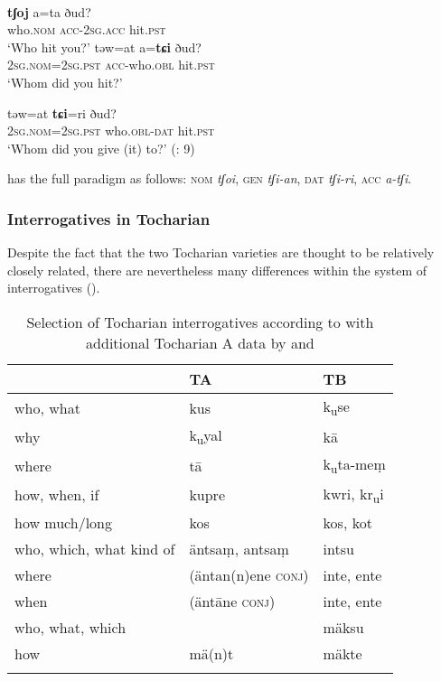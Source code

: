 \ea%
    \label{ex:indo:44}
    \\
    \ea
    \gll \textbf{{tʃoj}} a=ta    ðud?\\
    who.\textsc{nom}    \textsc{acc}-2\textsc{sg.acc}  hit.\textsc{pst}\\
    \glt ‘Who hit you?’
\clearpage %
    \ex
    \gll təw=at      a=\textbf{{tɕi}} ðud?\\
    2\textsc{sg}.\textsc{nom=2sg.pst}  \textsc{acc}-who.\textsc{obl}  hit.\textsc{pst}\\
    \glt ‘Whom did you hit?’
    
    \ex
    \gll təw=at \textbf{{tɕi}}=ri    ðud?\\
    2\textsc{sg}.\textsc{nom=2sg.pst}  who.\textsc{obl-dat}  hit.\textsc{pst}\\
    \glt ‘Whom did you give (it) to?’ (\citealt{Kim2014}: 9)
    \z
    \z

\noindent \citet[35]{GaoErqiang1985} has the full paradigm as follows: \textsc{nom} \textit{tʃoi}, \textsc{gen} \textit{tʃi-an}, \textsc{dat} \textit{tʃi-ri}, \textsc{acc} \textit{a-tʃi}.

\subsubsection{Interrogatives in Tocharian}\label{sec:5.5.3.5}

Despite the fact that the two Tocharian varieties are thought to be relatively closely related, there are nevertheless many differences within the system of interrogatives ().

\begin{table}
\caption{Selection of Tocharian interrogatives according to \citet{Adams2013} with additional Tocharian A data by \citet[176–191]{SiegSiegling1931} and \citet{Carling2009}}
\label{tab:indo:19}

\begin{tabularx}{\textwidth}{XXX}
\lsptoprule
& \textbf{TA} & \textbf{TB}\\
\midrule
who, what & kus & k\textsubscript{u}se\\
why & k\textsubscript{u}yal & k\=a\\
where & t\=a & k\textsubscript{u}ta-meṃ\\
how, when, if & kupre & kwri, kr\textsubscript{u}i\\
how much/long & kos & kos, kot\\
who, which, what kind of & äntsaṃ, antsaṃ & intsu\\
where & (äntan(n)ene \textsc{conj)} & inte, ente\\
when & (änt\=ane \textsc{conj)} & inte, ente\\
who, what, which &  & mäksu\\
how & mä(n)t & mäkte\\
\lspbottomrule
\end{tabularx}
\end{table}

